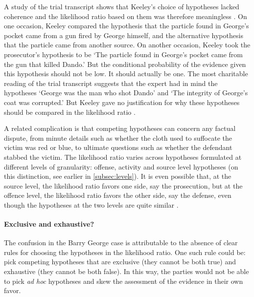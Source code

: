 \documentclass{article}
\begin{document}
A study of the trial transcript shows that Keeley's choice of hypotheses lacked coherence and the likelihood ratio based on them was therefore meaningless \citep{fenton2014WhenNeutralEvidence}. 
On one occasion, Keeley compared the hypothesis that the particle found in George's pocket came from a gun fired by George himself, and the alternative hypothesis that the particle came from another source. 
On another occasion, Keeley took the prosecutor's hypothesis to be `The particle found in George's pocket came from the gun that killed Dando.' 
But the  conditional probability of the evidence given this hypothesis should not be low. It should actually be one. 
The most charitable reading of the trial transcript   suggests that the expert had in mind the hypotheses 
 `George was the man who shot Dando' and  `The integrity of George's coat was corrupted.' But 
Keeley gave no justification  for why these hypotheses should be compared in the 
 likelihood ratio \citep[see][for details]{fenton2014WhenNeutralEvidence}.
 
 A related complication is that
competing hypotheses can concern any factual dispute, from minute details such as whether the cloth used to suffocate the victim was red or blue, to ultimate questions such as whether the defendant stabbed the victim.  The likelihood ratio varies across hypotheses formulated at different levels of granularity: offense, activity and source level hypotheses (on this distinction, see earlier in \ref{subsec:levels}). It is even possible that, at the source level, the likelihood ratio  favors one side, say the prosecution, but at the offence level, the likelihood ratio  favors the other side, say the defense, even though the hypotheses at the two levels are quite similar %
\citep{fenton2014WhenNeutralEvidence}.






\paragraph{Exclusive and exhaustive?}

The confusion in the Barry George case is attributable to the absence of clear rules for choosing the hypotheses in the likelihood ratio.
One such rule  could be: pick competing hypotheses that are exclusive (they cannot be both true) and exhaustive (they cannot be both false). In this way, the parties would not be able to pick  \textit{ad hoc} hypotheses and skew the assessment of the evidence in their own favor. 
\end{document}
